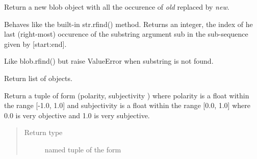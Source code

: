 \documentclass[letterpaper,10pt,english]{sphinxmanual}
\begin{document}
\begin{fulllineitems}
\begin{fulllineitems}
\end{fulllineitems}


\begin{fulllineitems}
\label{api_reference:textblob_de.blob.TextBlobDE.replace}
Return a new blob object with all the occurence of \emph{old} replaced
by \emph{new}.

\end{fulllineitems}


\begin{fulllineitems}
\label{api_reference:textblob_de.blob.TextBlobDE.rfind}
Behaves like the built-in str.rfind() method. Returns an integer,
the index of he last (right-most) occurence of the substring argument
sub in the sub-sequence given by {[}start:end{]}.

\end{fulllineitems}


\begin{fulllineitems}
\label{api_reference:textblob_de.blob.TextBlobDE.rindex}
Like blob.rfind() but raise ValueError when substring is not
found.

\end{fulllineitems}


\begin{fulllineitems}
\label{api_reference:textblob_de.blob.TextBlobDE.sentences}
Return list of {\hyperref[api_reference:textblob_de.blob.Sentence]{}} objects.

\end{fulllineitems}


\begin{fulllineitems}
\label{api_reference:textblob_de.blob.TextBlobDE.sentiment}
Return a tuple of form (polarity, subjectivity ) where polarity
is a float within the range {[}-1.0, 1.0{]} and subjectivity is a float
within the range {[}0.0, 1.0{]} where 0.0 is very objective and 1.0 is
very subjective.
\begin{quote}\begin{description}
\item[{Return type}] \leavevmode
named tuple of the form 


\end{description}
\end{quote}
\end{fulllineitems}
\end{fulllineitems}
\end{document}
